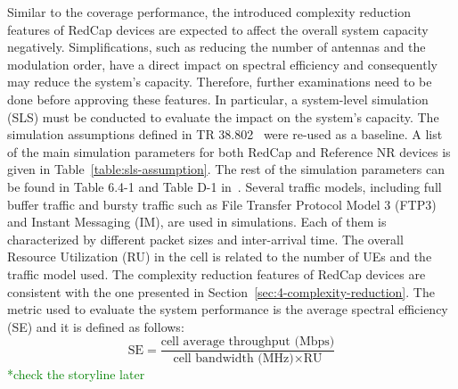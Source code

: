 \documentclass[]{IEEEtran}
\newcommand{\CAREPL}[2]{\textcolor{red}{#1}\textcolor{green}{#2}}
\begin{document}
Similar to the coverage performance, the introduced complexity reduction features of RedCap devices are expected to affect the overall system capacity negatively. 
Simplifications, such as reducing the number of antennas and the modulation order, have a direct impact on spectral efficiency and consequently may reduce the system's capacity. 
Therefore, further examinations need to be done before approving these features.
In particular, a system-level simulation (SLS) must be conducted to evaluate the impact on the system's capacity. 
The simulation assumptions defined in TR 38.802~\cite{3gpp_study_nodate-2_38.802} were re-used as a baseline. 
A list of the main simulation parameters for both RedCap and Reference NR devices is given in Table~\ref{table:sls-assumption}. 
The rest of the simulation parameters can be found in Table 6.4-1 and Table D-1 in~\cite{3gpp_study_2021_38.875}. 
Several traffic models, including full buffer traffic and bursty traffic such as File Transfer Protocol Model 3 (FTP3) and Instant Messaging (IM), are used in simulations. Each of them is characterized by different packet sizes and inter-arrival time. 
The overall Resource Utilization (RU) in the cell is related to the number of UEs and the traffic model used. The complexity reduction features of RedCap devices are consistent with the one presented in Section~\ref{sec:4-complexity-reduction}. The metric used to evaluate the system performance is the average spectral efficiency (SE) and it is defined as follows:
\begin{equation}
\textrm{SE}=\frac{\textrm{cell average throughput (Mbps)}}{\textrm{cell bandwidth (MHz)}\times\textrm{RU}}
\label{equ:spectral-efficiency}
\end{equation}
\CAREPL{}{*check the storyline later}
\end{document}

